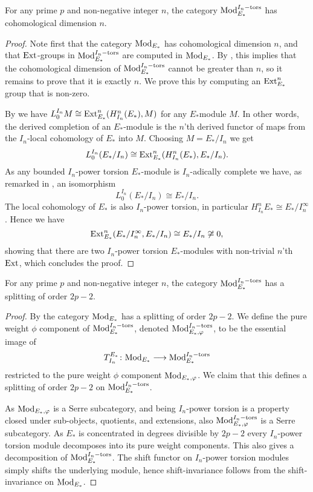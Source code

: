 \begin{lemma}
    \label{ch1:lm:cohomological-dimension-torsion-modules}
    For any prime $p$ and non-negative integer $n$, the category $\mathrm{Mod}_{E_*}^{I_n-\mathrm{tors}}$ has cohomological dimension $n$. 
\end{lemma}
\begin{proof}
    Note first that the category $\mathrm{Mod}_{E_*}$ has cohomological dimension $n$, and that $\operatorname{Ext}$-groups in $\mathrm{Mod}_{E_*}^{I_n-\mathrm{tors}}$ are computed in $\mathrm{Mod}_{E_*}$. By \cite[2.1.4]{brodmann-sharp_1998}, this implies that the cohomological dimension of $\mathrm{Mod}_{E_*}^{I_n-\mathrm{tors}}$ cannot be greater than $n$, so it remains to prove that it is exactly $n$. We prove this by computing an $\operatorname{Ext}^n_{E_*}$ group that is non-zero.
    
    By \cite[A.2(d)]{hovey-strickland_99} we have $L^{I_n}_0 M \cong \operatorname{Ext}_{E_*}^n(H_{I_n}^n(E_*), M)$ for any $E_*$module $M$. In other words, the derived completion of an $E_*$-module is the $n$'th derived functor of maps from the $I_n$-local cohomology of $E_*$ into $M$. Choosing $M=E_*/I_n$ we get 
    \[L^{I_n}_0 (E_*/I_n)\cong \operatorname{Ext}_{E_*}^n(H^n_{I_n}(E_*), E_*/I_n).\]
    As any bounded $I_n$-power torsion $E_*$-module is $I_n$-adically complete we have, as remarked in \cite[1.4]{barthel-heard_16}, an isomorphism 
    \[L^{I_n}_0 (E_*/I_n)\cong E_*/I_n.\] 
    The local cohomology of $E_*$ is also $I_n$-power torsion, in particular $H_{I_n}^n E_* \cong E_*/I_n^\infty$. Hence we have 
    \[\operatorname{Ext}_{E_*}^n(E_*/I_n^\infty, E_*/I_n)\cong E_*/I_n \not \cong 0,\]
    showing that there are two $I_n$-power torsion $E_*$-modules with non-trivial $n$'th $\operatorname{Ext}$, which concludes the proof.
\end{proof}

\begin{lemma}
    \label{ch1:lm:splitting-torsion-modules}
    For any prime $p$ and non-negative integer $n$, the category $\mathrm{Mod}_{E_*}^{I_n-\mathrm{tors}}$ has a splitting of order $2p-2$. 
\end{lemma}
\begin{proof}
    By \cite[8.1]{patchkoria-pstragowski_2021} the category $\mathrm{Mod}_{E_*}$ has a splitting of order $2p-2$. We define the pure weight $\phi$ component of $\mathrm{Mod}_{E_*}^{I_n-\mathrm{tors}}$, denoted $\mathrm{Mod}_{E_*, \varphi}^{I_n-\mathrm{tors}}$, to be the essential image of 
    \[T_{I_n}^{E_*}\colon \mathrm{Mod}_{E_*}\longrightarrow \mathrm{Mod}_{E_*}^{I_n-\mathrm{tors}}\]
    restricted to the pure weight $\phi$ component $\mathrm{Mod}_{E_*, \varphi}$. We claim that this defines a splitting of order $2p-2$ on $\mathrm{Mod}_{E_*}^{I_n-\mathrm{tors}}$. 

    As $\mathrm{Mod}_{E_*, \varphi}$ is a Serre subcategory, and being $I_n$-power torsion is a property closed under sub-objects, quotients, and extensions, also $\mathrm{Mod}_{E_*, \varphi}^{I_n-\mathrm{tors}}$ is a Serre subcategory. As $E_*$ is concentrated in degrees divisible by $2p-2$ every $I_n$-power torsion module decomposes into its pure weight components. This also gives a decomposition of $\mathrm{Mod}_{E_*}^{I_n-\mathrm{tors}}$. The shift functor on $I_n$-power torsion modules simply shifts the underlying module, hence shift-invariance follows from the shift-invariance on $\mathrm{Mod}_{E_*}$. 
\end{proof}


